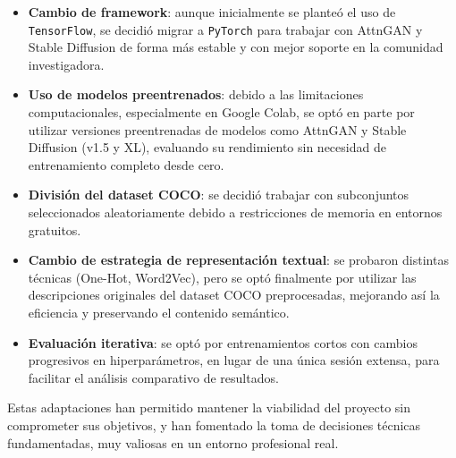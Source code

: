 \begin{itemize}
    \item \textbf{Cambio de framework}: aunque inicialmente se planteó el uso de \texttt{TensorFlow}, se decidió migrar a \texttt{PyTorch} para trabajar con AttnGAN y Stable Diffusion de forma más estable y con mejor soporte en la comunidad investigadora.
    
    \item \textbf{Uso de modelos preentrenados}: debido a las limitaciones computacionales, especialmente en Google Colab, se optó en parte por utilizar versiones preentrenadas de modelos como AttnGAN y Stable Diffusion (v1.5 y XL), evaluando su rendimiento sin necesidad de entrenamiento completo desde cero.
    
    \item \textbf{División del dataset COCO}: se decidió trabajar con subconjuntos seleccionados aleatoriamente debido a restricciones de memoria en entornos gratuitos.
    
    \item \textbf{Cambio de estrategia de representación textual}: se probaron distintas técnicas (One-Hot, Word2Vec), pero se optó finalmente por utilizar las descripciones originales del dataset COCO preprocesadas, mejorando así la eficiencia y preservando el contenido semántico.
    
    \item \textbf{Evaluación iterativa}: se optó por entrenamientos cortos con cambios progresivos en hiperparámetros, en lugar de una única sesión extensa, para facilitar el análisis comparativo de resultados.
\end{itemize}

Estas adaptaciones han permitido mantener la viabilidad del proyecto sin comprometer sus objetivos, y han fomentado la toma de decisiones técnicas fundamentadas, muy valiosas en un entorno profesional real.
